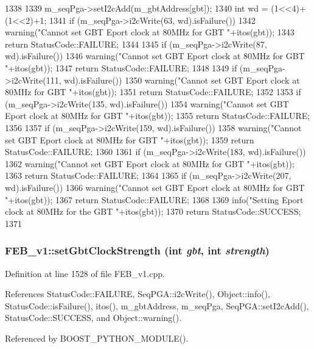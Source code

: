 \begin{DoxyCode}
1338                                              {
1339   m_seqPga->setI2cAdd(m_gbtAddress[gbt]);
1340   int wd = (1<<4)+(1<<2)+1;
1341   if (m_seqPga->i2cWrite(63, wd).isFailure()){
1342     warning("Cannot set GBT Eport clock at 80MHz for GBT "+itos(gbt));
1343     return StatusCode::FAILURE;
1344   }
1345   if (m_seqPga->i2cWrite(87, wd).isFailure()){
1346     warning("Cannot set GBT Eport clock at 80MHz for GBT "+itos(gbt));
1347     return StatusCode::FAILURE;
1348   }
1349   if (m_seqPga->i2cWrite(111, wd).isFailure()){
1350     warning("Cannot set GBT Eport clock at 80MHz for GBT "+itos(gbt));
1351     return StatusCode::FAILURE;
1352   }
1353   if (m_seqPga->i2cWrite(135, wd).isFailure()){
1354     warning("Cannot set GBT Eport clock at 80MHz for GBT "+itos(gbt));
1355     return StatusCode::FAILURE;
1356   }
1357   if (m_seqPga->i2cWrite(159, wd).isFailure()){
1358     warning("Cannot set GBT Eport clock at 80MHz for GBT "+itos(gbt));
1359     return StatusCode::FAILURE;
1360   }
1361   if (m_seqPga->i2cWrite(183, wd).isFailure()){
1362     warning("Cannot set GBT Eport clock at 80MHz for GBT "+itos(gbt));
1363     return StatusCode::FAILURE;
1364   }
1365   if (m_seqPga->i2cWrite(207, wd).isFailure()){
1366     warning("Cannot set GBT Eport clock at 80MHz for GBT "+itos(gbt));
1367     return StatusCode::FAILURE;
1368   }
1369   info("Setting Eport clock at 80MHz for the GBT "+itos(gbt));
1370   return StatusCode::SUCCESS;
1371 }
\end{DoxyCode}
\hypertarget{classFEB__v1_a717d56186e6221cb20397cc3e496da50}{
\subsubsection[{setGbtClockStrength}]{ FEB\_\-v1::setGbtClockStrength (int {\em gbt}, \/  int {\em strength})}}
\label{classFEB__v1_a717d56186e6221cb20397cc3e496da50}


Definition at line 1528 of file FEB\_\-v1.cpp.

References StatusCode::FAILURE, SeqPGA::i2cWrite(), Object::info(), StatusCode::isFailure(), itos(), m\_\-gbtAddress, m\_\-seqPga, SeqPGA::setI2cAdd(), StatusCode::SUCCESS, and Object::warning().

Referenced by BOOST\_\-PYTHON\_\-MODULE().


